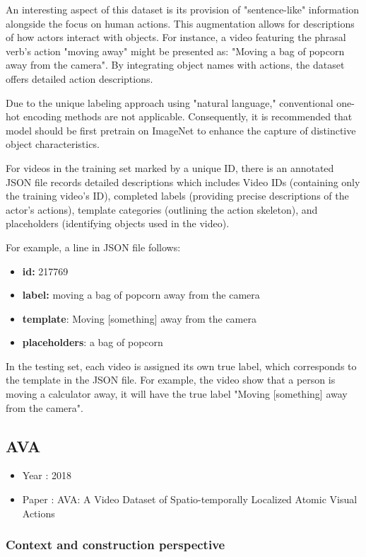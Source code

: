 \documentclass[10pt,onecolumn,letterpaper]{article}
\begin{document}
An interesting aspect of this dataset is its provision of "sentence-like" information alongside the focus on human actions. This augmentation allows for descriptions of how actors interact with objects. For instance, a video featuring the phrasal verb's action "moving away" might be presented as: "Moving a bag of popcorn away from the camera". By integrating object names with actions, the dataset offers detailed action descriptions. 

Due to the unique labeling approach using "natural language," conventional one-hot encoding methods are not applicable. Consequently, it is recommended that model should be first pretrain on ImageNet to enhance the capture of distinctive object characteristics.

For videos in the training set marked by a unique ID, there is an annotated JSON file records detailed descriptions which includes Video IDs (containing only the training video's ID), completed labels (providing precise descriptions of the actor's actions), template categories (outlining the action skeleton), and placeholders (identifying objects used in the video).

For example, a line in JSON file follows:
\begin{itemize}
\item \textbf{id:} 217769
\item \textbf{label:} moving a bag of popcorn away from the camera
\item \textbf{template}: Moving [something] away from the camera
\item \textbf{placeholders}: a bag of popcorn
\end{itemize}
In the testing set, each video is assigned its own true label, which corresponds to the template in the JSON file. For example, the video show that a person is moving a calculator away, it will have the true label "Moving [something] away from the camera".
\subsection{AVA}

\begin{itemize}
	\item Year : 2018
	\item Paper : AVA: A Video Dataset of Spatio-temporally Localized Atomic Visual
	Actions \cite{AVA}
\end{itemize}

\subsubsection{\textbf{Context and construction perspective}}
\end{document}

